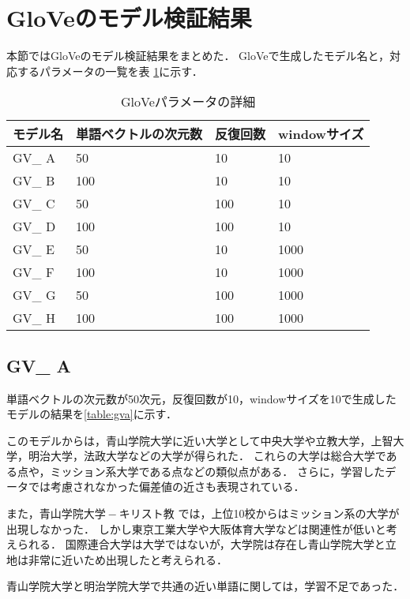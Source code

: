 \section{GloVeのモデル検証結果}
本節ではGloVeのモデル検証結果をまとめた．
GloVeで生成したモデル名と，対応するパラメータの一覧を表 \ref{table:gvResultAll}に示す．

\begin{table}[htbp]
\caption{GloVeパラメータの詳細}
\centering
\begin{tabular}{llll}
\hline
モデル名 & 単語ベクトルの次元数 & 反復回数 & windowサイズ
\\ \hline \hline
GV\_ A & 50 & 10 & 10\\ \hline
GV\_ B & 100 & 10 & 10\\ \hline
GV\_ C & 50 & 100 & 10\\ \hline
GV\_ D & 100 & 100 & 10\\ \hline
GV\_ E & 50 & 10 & 1000\\ \hline
GV\_ F & 100 & 10 & 1000\\ \hline
GV\_ G & 50 & 100 & 1000\\ \hline
GV\_ H & 100 & 100 & 1000\\ \hline
\end{tabular}
\label{table:gvResultAll}
\end{table}

\subsection{GV\_ A}
単語ベクトルの次元数が50次元，反復回数が10，windowサイズを10で生成したモデルの結果を\ref{table:gva}に示す．

このモデルからは，青山学院大学に近い大学として中央大学や立教大学，上智大学，明治大学，法政大学などの大学が得られた．
これらの大学は総合大学である点や，ミッション系大学である点などの類似点がある．
さらに，学習したデータでは考慮されなかった偏差値の近さも表現されている．

また，$ 青山学院大学 - キリスト教 $ では，上位10校からはミッション系の大学が出現しなかった．
しかし東京工業大学や大阪体育大学などは関連性が低いと考えられる．
国際連合大学は大学ではないが，大学院は存在し青山学院大学と立地は非常に近いため出現したと考えられる．

青山学院大学と明治学院大学で共通の近い単語に関しては，学習不足であった．


